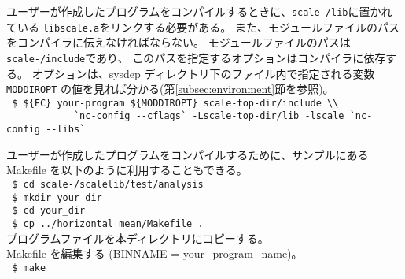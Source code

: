 ユーザーが作成したプログラムをコンパイルするときに、\texttt{scale-\version/lib}に置かれている
\verb|libscale.a|をリンクする必要がある。
また、モジュールファイルのパスをコンパイラに伝えなければならない。
モジュールファイルのパスは\texttt{scale-\version/include}であり、
このパスを指定するオプションはコンパイラに依存する。
オプションは、sysdep ディレクトリ下のファイル内で指定される変数 \verb|MODDIROPT| の値を見れば分かる(第\ref{subsec:environment}節を参照)。\\
\verb| $ ${FC} your-program ${MODDIROPT} scale-top-dir/include \\|\\
\verb|            `nc-config --cflags` -Lscale-top-dir/lib -lscale `nc-config --libs`|

ユーザーが作成したプログラムをコンパイルするために、サンプルにある Makefile を以下のように利用することもできる。\\
\texttt{ \$ cd scale-\version/scalelib/test/analysis}\\
\texttt{ \$ mkdir your\_dir}\\
\texttt{ \$ cd your\_dir}\\
\texttt{ \$ cp ../horizontal\_mean/Makefile .}\\
プログラムファイルを本ディレクトリにコピーする。\\
Makefile を編集する (BINNAME = your\_program\_name)。\\
\texttt{ \$ make}
